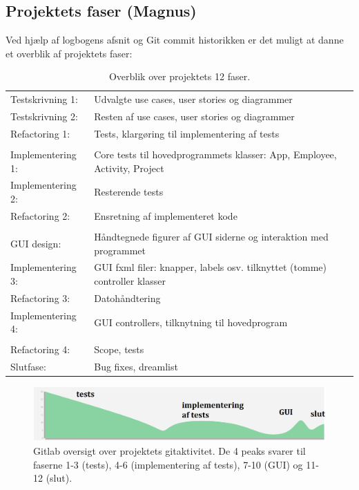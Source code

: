 \subsection{Projektets faser (Magnus)}

Ved hjælp af logbogens afsnit og Git commit historikken er det muligt at danne et overblik af projektets faser:

\begin{table}[H]
\centering
\begin{tabular}{ll}
Testskrivning 1: & Udvalgte use cases, user stories og diagrammer \\

Testskrivning 2: & Resten af use cases, user stories og diagrammer \\

Refactoring 1: & Tests, klargøring til implementering af tests \\

\\
Implementering 1: & Core tests til hovedprogrammets klasser: App, Employee, Activity, Project  \\

Implementering 2: & Resterende tests  \\

Refactoring 2: & Ensretning af implementeret kode \\
\\ 

GUI design: & Håndtegnede figurer af GUI siderne og interaktion med programmet  \\

Implementering 3: & GUI fxml filer: knapper, labels osv. tilknyttet (tomme) controller klasser  \\

Refactoring 3: & Datohåndtering \\

Implementering 4: & GUI controllers, tilknytning til hovedprogram\\
\\

Refactoring 4: & Scope, tests \\

Slutfase: & Bug fixes, dreamlist \\


\end{tabular}
\caption{Overblik over projektets 12 faser.}
\label{tab:tidslinje}
\end{table}

\begin{figure}[H]
    \centering
    \includegraphics[width = 1.0\textwidth]{Figurer/commits_to_master.PNG}
    \caption{Gitlab oversigt over projektets gitaktivitet. De 4 peaks svarer til faserne 1-3 (tests), 4-6 (implementering af tests), 7-10 (GUI) og 11-12 (slut).}
\end{figure}

